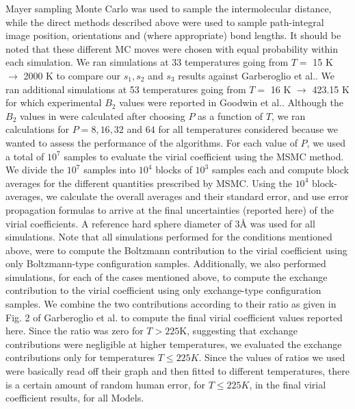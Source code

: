         Mayer sampling Monte Carlo was used to sample the intermolecular distance, while the direct methods described above were used to sample path-integral image position, orientations and (where appropriate) bond lengths. It should be noted that these different MC moves were chosen with equal probability within each simulation. We ran simulations at 33 temperatures going from $T =$ 15 K $\to$ 2000 K to compare our $s_1, s_2$ and $s_3$ results against Garberoglio et al.\cite{Garberoglio2014}. We ran additional simulations at 53 temperatures going from $T =$ 16 K $\to$ 423.15 K for which experimental $B_2$ values were reported in Goodwin et al.\cite{Goodwin1963}. Although the $B_2$ values in \cite{Garberoglio2014} were calculated after choosing $P$ as a function of $T$, we ran calculations for $P = 8, 16, 32$ and $64$ for all temperatures considered because we wanted to assess the performance of the algorithms. For each value of $P$, we used a total of $10^7$ samples to evaluate the virial coefficient using the MSMC\cite{Singh2004} method. We divide the $10^7$ samples into $10^4$ blocks of $10^3$ samples each and compute block averages for the different quantities prescribed by MSMC. Using the $10^4$ block-averages, we calculate the overall averages and their standard error, and use error propagation formulas to arrive at the final uncertainties (reported here) of the virial coefficients. A reference hard sphere diameter of 3{\AA} was used for all simulations.
        Note that all simulations performed for the conditions mentioned above, were to compute the Boltzmann contribution to the virial coefficient using only Boltzmann-type configuration samples. Additionally, we also performed simulations, for each of the cases mentioned above, to compute the exchange contribution to the virial coefficient using only exchange-type configuration samples. We combine the two contributions according to their ratio as given in Fig. 2 of Garberoglio et al. \cite{Garberoglio2014} to compute the final virial coefficient values reported here. Since the ratio was zero for $T > 225$K, suggesting that exchange contributions were negligible at higher temperatures, we evaluated the exchange contributions only for temperatures $T \le 225 K$. Since the values of ratios we used were basically read off their graph and then fitted to different temperatures, there is a certain amount of random human error, for $T \le 225 K$, in the final virial coefficient results, for all Models. 
